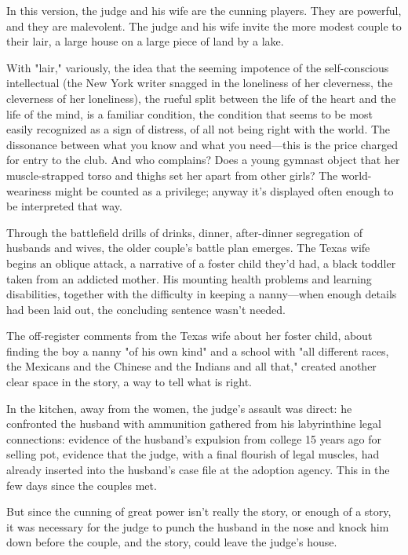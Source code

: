 \documentclass[
]{memoir}
\begin{document}
In this version, the judge and his wife are the cunning players. They
are powerful, and they are malevolent. The judge and his wife invite the
more modest couple to their lair, a large house on a large piece of land
by a lake.

With "lair," variously, the idea that the seeming impotence of the
self-conscious intellectual (the New York writer snagged in the
loneliness of her cleverness, the cleverness of her loneliness), the
rueful split between the life of the heart and the life of the mind, is
a familiar condition, the condition that seems to be most easily
recognized as a sign of distress, of all not being right with the world.
The dissonance between what you know and what you need---this is the
price charged for entry to the club. And who complains? Does a young
gymnast object that her muscle-strapped torso and thighs set her apart
from other girls? The world-weariness might be counted as a privilege;
anyway it's displayed often enough to be interpreted that way.

Through the battlefield drills of drinks, dinner, after-dinner
segregation of husbands and wives, the older couple's battle plan
emerges. The Texas wife begins an oblique attack, a narrative of a
foster child they'd had, a black toddler taken from an addicted mother.
His mounting health problems and learning disabilities, together with
the difficulty in keeping a nanny---when enough details had been laid
out, the concluding sentence wasn't needed.

The off-register comments from the Texas wife about her foster child,
about finding the boy a nanny "of his own kind" and a school with "all
different races, the Mexicans and the Chinese and the Indians and all
that," created another clear space in the story, a way to tell what is
right.

In the kitchen, away from the women, the judge's assault was direct: he
confronted the husband with ammunition gathered from his labyrinthine
legal connections: evidence of the husband's expulsion from college 15
years ago for selling pot, evidence that the judge, with a final
flourish of legal muscles, had already inserted into the husband's case
file at the adoption agency. This in the few days since the couples met.

But since the cunning of great power isn't really the story, or enough
of a story, it was necessary for the judge to punch the husband in the
nose and knock him down before the couple, and the story, could leave
the judge's house.
\end{document}

